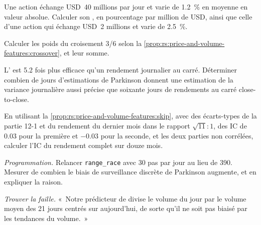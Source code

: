 \begin{exercise}[$\star$]\label{exo:rs:price-and-volume-features:3}
Une action échange USD~40 millions par jour et varie de 1.2~\% en moyenne en valeur absolue. Calculer son , en pourcentage
par million de USD, ainsi que celle d'une action qui échange USD~2 millions et varie de 2.5~\%.
\end{exercise}

\begin{exercise}[$\star\star$]\label{exo:rs:price-and-volume-features:4}
Calculer les poids du croisement 3/6 selon la \cref{prop:rs:price-and-volume-features:crossover}, et leur somme.
\end{exercise}

\begin{exercise}[$\star\star$]\label{exo:rs:price-and-volume-features:5}
L' est 5.2 fois plus efficace qu'un rendement journalier au carré. Déterminer combien de jours d'estimations de Parkinson donnent une estimation de la variance journalière
aussi précise que soixante jours de rendements au carré close-to-close.
\end{exercise}

\begin{exercise}[$\star\star$]\label{exo:rs:price-and-volume-features:6}
En utilisant la \cref{prop:rs:price-and-volume-features:skip}, avec des écarts-types de la partie 12-1 et du rendement du dernier mois dans le rapport
$\sqrt{11}:1$, des IC de 0.03 pour la première et $-0.03$ pour la seconde, et les deux parties non corrélées, calculer l'IC du rendement complet sur
douze mois.
\end{exercise}

\begin{exercise}[$\star\star\star$]\label{exo:rs:price-and-volume-features:7}
\emph{Programmation.} Relancer \texttt{range\_race} avec 30 pas par jour au lieu de 390. Mesurer de combien le biais de surveillance discrète de Parkinson
augmente, et en expliquer la raison.
\end{exercise}

\begin{exercise}[$\star\star\star$]\label{exo:rs:price-and-volume-features:8}
\emph{Trouver la faille.} «~Notre prédicteur de  divise le volume du jour par le volume moyen des 21 jours centrés sur aujourd'hui, de sorte
qu'il ne soit pas biaisé par les tendances du volume.~»
\end{exercise}

